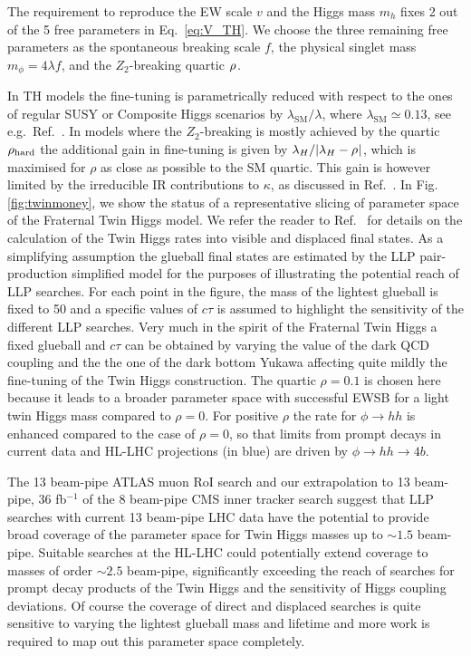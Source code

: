 The requirement to reproduce the EW scale $v$ and the Higgs mass $m_h$ fixes 2 out of the 5 free parameters in Eq.~\eqref{eq:V_TH}.
We choose the three remaining free parameters as the spontaneous breaking scale $f$, the physical singlet mass $m_\phi=4\lambda f$, and the $Z_2$-breaking quartic $\rho_{\rm}$.

In TH models the fine-tuning is parametrically reduced with respect to the ones of regular SUSY or Composite Higgs scenarios by $\lambda_{\text{SM}}/\lambda$, where $\lambda_{\text{SM}}\simeq 0.13$, see e.g.\ Ref.~\cite{Katz:2016wtw,Contino:2017moj}. In models where the $Z_2$-breaking is mostly achieved by the quartic $\rho_{\rm hard}$ the additional gain in fine-tuning is given by $\lambda_H/\vert\lambda_H-\rho_{\rm}\vert$, which is maximised for $\rho$ as close as possible to the SM quartic. This gain is however limited by the irreducible IR contributions to $\kappa$, as discussed in Ref.~\cite{Katz:2016wtw}. 
In Fig. \ref{fig:twinmoney}, we show the status of a representative slicing of parameter space of the Fraternal Twin Higgs model. We refer the reader to Ref.~\cite{Alipour-fard:2018mre} for details on the calculation of the Twin Higgs rates into visible and displaced final states. As a simplifying assumption the glueball final states are estimated by the LLP pair-production simplified model for the purposes of illustrating the potential reach of LLP searches. For each point in the figure, the mass of the lightest glueball is fixed to 50 \UGeV and a specific values of $c \tau$ is assumed to highlight the sensitivity of the different LLP searches. Very much in the spirit of the Fraternal Twin Higgs \cite{Craig:2015pha} a fixed glueball and $c \tau$ can be obtained by varying the value of the dark QCD coupling and the the one of the dark bottom Yukawa affecting quite mildly the fine-tuning   of the Twin Higgs construction. The quartic $\rho = 0.1$ is chosen here because it leads to a broader parameter space with successful EWSB for a light twin Higgs mass compared to $\rho = 0$. For positive $\rho$ the rate for $\phi \rightarrow hh$ is enhanced compared to the case of $\rho = 0$, so that limits from prompt decays in current data and HL-LHC projections (in blue) are driven by $\phi \rightarrow hh \rightarrow 4b$. 

The 13 beam-pipe ATLAS muon RoI search and our extrapolation to 13 beam-pipe, 36 fb$^{-1}$ of the 8 beam-pipe CMS inner tracker search \cite{CMS:2014wda} suggest that LLP searches with current 13 beam-pipe LHC data have the potential to provide broad coverage of the parameter space for Twin Higgs masses up to $\sim 1.5$ beam-pipe. Suitable searches at the HL-LHC could potentially extend coverage to masses of order $\sim 2.5$ beam-pipe, significantly exceeding the reach of searches for prompt decay products of the Twin Higgs and the sensitivity of Higgs coupling deviations. Of course the coverage of direct and displaced searches is quite sensitive to varying the lightest glueball mass and lifetime and more work is required to map out this parameter space completely. 


